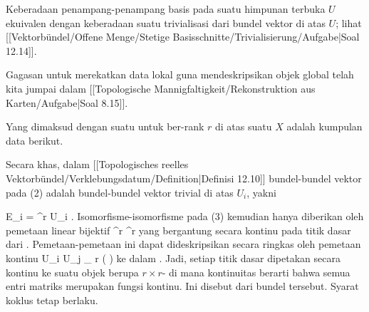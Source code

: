 Keberadaan penampang-penampang basis
 {} {}
pada suatu himpunan terbuka $U$ ekuivalen dengan keberadaan suatu trivialisasi
 {} {}
dari bundel vektor di atas $U$; lihat
[[Vektorbündel/Offene Menge/Stetige Basisschnitte/Trivialisierung/Aufgabe|Soal 12.14]].


Gagasan untuk merekatkan data lokal guna mendeskripsikan objek global telah kita jumpai dalam
[[Topologische Mannigfaltigkeit/Rekonstruktion aus Karten/Aufgabe|Soal 8.15]].

{}
{

Yang dimaksud dengan suatu
untuk
ber-rank $r$ di atas suatu
$X$ adalah kumpulan data berikut.

}

{}
{

Secara khas, dalam
[[Topologisches reelles Vektorbündel/Verklebungsdatum/Definition|Definisi 12.10]]
bundel-bundel vektor pada (2) adalah bundel-bundel vektor trivial di atas $U_i$, yakni

\mavergleichskette
{\vergleichskette
{E_i
}
{ = }{ \R^r \times U_i
}
{  }{
}
{    }{
}
{   }{
}
}
{}{}{.}
Isomorfisme-isomorfisme pada (3) kemudian hanya diberikan oleh pemetaan linear bijektif
 { \R^r} { \R^r
} {}
yang bergantung secara kontinu pada titik dasar dari
. Pemetaan-pemetaan ini dapat dideskripsikan secara ringkas oleh pemetaan kontinu
 {U_i \cap U_j } { _{  r   } \! \left(  \R  \right)
} {}
ke dalam
. Jadi, setiap titik dasar dipetakan secara kontinu ke suatu objek
berupa $r \times r$-
di mana kontinuitas berarti bahwa semua entri matriks merupakan fungsi kontinu. Ini disebut  {} dari bundel tersebut. Syarat koklus tetap berlaku.

}

